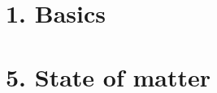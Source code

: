 \documentclass{cheatsheet}
\author{Noa Sendlhofer \& Christian Leser \\ nsendlhofer \& cleser}
\begin{document}
\section{1. Basics}
	
\section{5. State of matter}
	
\end{document}
